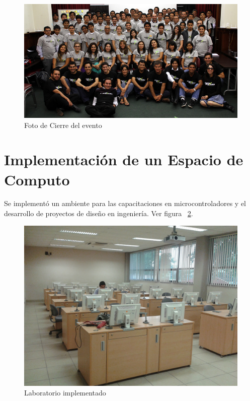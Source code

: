 \begin{figure}[h!]
  \centering
  \includegraphics[scale=0.5]{images/activities/capacitaciones/startup-academy-2.jpg}
  \caption{Foto de Cierre del evento}
  \label{fig:startup-academy-2}
\end{figure}

\clearpage


\section{Implementación de un Espacio de Computo}

Se implementó un ambiente para las capacitaciones en microcontroladores y el desarrollo de proyectos de diseño en ingeniería. Ver figura ~\ref{fig:labo}.

\begin{figure}[h!]
  \centering
  \includegraphics[scale=0.12]{images/activities/laboratorio/labo.jpg}
  \caption{Laboratorio implementado}
  \label{fig:labo}
\end{figure}